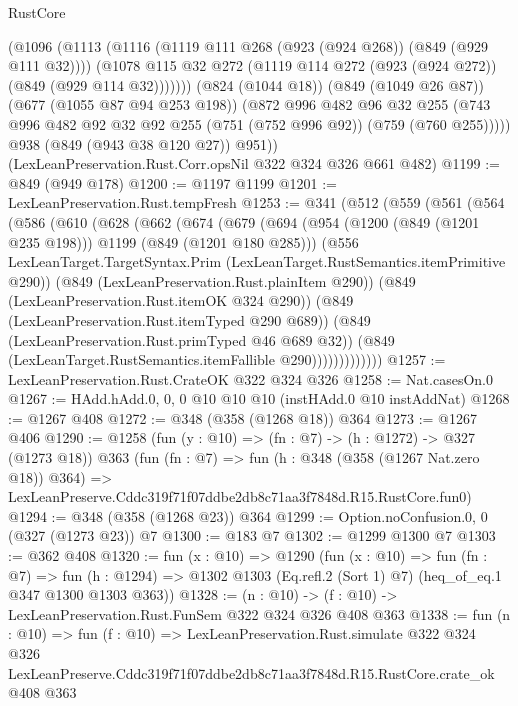 \begin{lexlean}{RustCore}
\begin{coremodule}
            (@1096
              (@1113
                (@1116 (@1119 @111 @268 (@923 (@924 @268)) (@849 (@929 @111 @32))))
                (@1078 @115 @32 @272 (@1119 @114 @272 (@923 (@924 @272)) (@849 (@929 @114 @32)))))))
          (@824 (@1044 @18))
          (@849 (@1049 @26 @87))
          (@677 (@1055 @87 @94 @253 @198))
          (@872
            @996
            @482
            @96
            @32
            @255
            (@743 @996 @482 @92 @32 @92 @255 (@751 (@752 @996 @92)) (@759 (@760 @255)))))
        @938
        (@849 (@943 @38 @120 @27))
        @951))
    (LexLeanPreservation.Rust.Corr.opsNil @322 @324 @326 @661 @482)
@1199 := @849 (@949 @178)
@1200 := @1197 @1199
@1201 := LexLeanPreservation.Rust.tempFresh
@1253 := @341
    (@512
      (@559
        (@561
          (@564
            (@586
              (@610
                (@628
                  (@662
                    (@674
                      (@679
                        (@694
                          (@954 (@1200 (@849 (@1201 @235 @198))) @1199 (@849 (@1201 @180 @285)))
                          (@556
                            LexLeanTarget.TargetSyntax.Prim
                            (LexLeanTarget.RustSemantics.itemPrimitive @290))
                          (@849 (LexLeanPreservation.Rust.plainItem @290))
                          (@849 (LexLeanPreservation.Rust.itemOK @324 @290))
                          (@849 (LexLeanPreservation.Rust.itemTyped @290 @689))
                          (@849 (LexLeanPreservation.Rust.primTyped @46 @689 @32))
                          (@849 (LexLeanTarget.RustSemantics.itemFallible @290)))))))))))))
@1257 := LexLeanPreservation.Rust.CrateOK @322 @324 @326
@1258 := Nat.casesOn.{0}
@1267 := HAdd.hAdd.{0, 0, 0} @10 @10 @10 (instHAdd.{0} @10 instAddNat)
@1268 := @1267 @408
@1272 := @348 (@358 (@1268 @18)) @364
@1273 := @1267 @406
@1290 := @1258
    (fun (y : @10) => (fn : @7) -> (h : @1272) -> @327 (@1273 @18))
    @363
    (fun (fn : @7) =>
    fun (h : @348 (@358 (@1267 Nat.zero @18)) @364) =>
    LexLeanPreserve.Cddc319f71f07ddbe2db8c71aa3f7848d.R15.RustCore.fun0)
@1294 := @348 (@358 (@1268 @23)) @364
@1299 := Option.noConfusion.{0, 0} (@327 (@1273 @23)) @7
@1300 := @183 @7
@1302 := @1299 @1300 @7
@1303 := @362 @408
@1320 := fun (x : @10) =>
  @1290
    (fun (x : @10) =>
    fun (fn : @7) =>
    fun (h : @1294) => @1302 @1303 (Eq.refl.{2} (Sort 1) @7) (heq_of_eq.{1} @347 @1300 @1303 @363))
@1328 := (n : @10) -> (f : @10) -> LexLeanPreservation.Rust.FunSem @322 @324 @326 @408 @363
@1338 := fun (n : @10) =>
  fun (f : @10) =>
  LexLeanPreservation.Rust.simulate
    @322
    @324
    @326
    LexLeanPreserve.Cddc319f71f07ddbe2db8c71aa3f7848d.R15.RustCore.crate_ok
    @408
    @363
\end{coremodule}
\end{lexlean}
